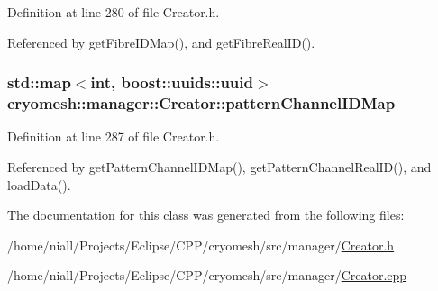 \-Definition at line 280 of file \-Creator.\-h.



\-Referenced by get\-Fibre\-I\-D\-Map(), and get\-Fibre\-Real\-I\-D().

\hypertarget{classcryomesh_1_1manager_1_1Creator_a23dfcdd559d8bdbb1d03aac2587feb3a}{
\subsubsection[{pattern\-Channel\-I\-D\-Map}]{\setlength{\rightskip}{0pt plus 5cm}std\-::map$<$int, boost\-::uuids\-::uuid$>$ {\bf cryomesh\-::manager\-::\-Creator\-::pattern\-Channel\-I\-D\-Map}}}\label{classcryomesh_1_1manager_1_1Creator_a23dfcdd559d8bdbb1d03aac2587feb3a}


\-Definition at line 287 of file \-Creator.\-h.



\-Referenced by get\-Pattern\-Channel\-I\-D\-Map(), get\-Pattern\-Channel\-Real\-I\-D(), and load\-Data().



\-The documentation for this class was generated from the following files\-:\begin{DoxyCompactItemize}
\item 
/home/niall/\-Projects/\-Eclipse/\-C\-P\-P/cryomesh/src/manager/\hyperlink{Creator_8h}{\-Creator.\-h}\item 
/home/niall/\-Projects/\-Eclipse/\-C\-P\-P/cryomesh/src/manager/\hyperlink{Creator_8cpp}{\-Creator.\-cpp}\end{DoxyCompactItemize}
